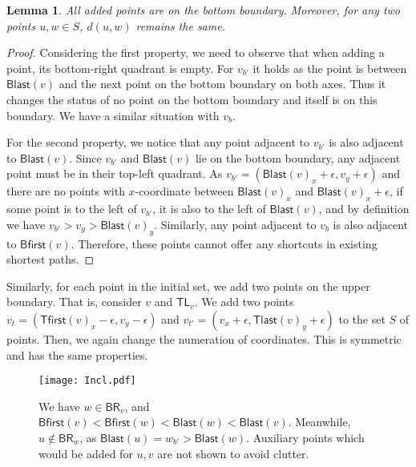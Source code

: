 \documentclass[a4paper,11pt]{article}
\newcommand{\BR}{\mathsf{BR}}
\newcommand{\TL}{\mathsf{TL}}
\newcommand{\Blast}{\mathsf{Blast}}
\newcommand{\Bfirst}{\mathsf{Bfirst}}
\newcommand{\Tlast}{\mathsf{Tlast}}
\newcommand{\Tfirst}{\mathsf{Tfirst}}
\newtheorem{lemma}[theorem]{Lemma}
\begin{document}
\begin{lemma}
All added points are on the bottom boundary.
Moreover, for any two points $u,w \in S$, $d(u,w)$ remains the same.
\end{lemma}
\begin{proof}
Considering the first property, we need to observe that when adding a point, its bottom-right quadrant is empty.
For $v_{b'}$ it holds as the point is between $\Blast(v)$ and the next point on the bottom boundary on both axes.
Thus it changes the status of no point on the bottom boundary and itself is on this boundary.
We have a similar situation with $v_{b}$.

For the second property, we notice that any point adjacent to $v_{b'}$ is also adjacent to $\Blast(v)$.
Since $v_{b'}$ and $\Blast(v)$ lie on the bottom boundary, any adjacent point must be in their top-left quadrant.
As $v_{b'}=(\Blast(v)_x+\epsilon,v_y+\epsilon)$ and there are no points with $x$-coordinate between $\Blast(v)_x$ and $\Blast(v)_x+\epsilon$,
if some point is to the left of $v_{b'}$, it is also to the left of $\Blast(v)$,
and by definition we have $v_{b'}>v_y>\Blast(v)_y$.
Similarly, any point adjacent to $v_{b}$ is also adjacent to $\Bfirst(v)$.
Therefore, these points cannot offer any shortcuts in existing shortest paths.
\end{proof}

Similarly, for each point in the initial set, we add two points on the upper boundary.
That is, consider $v$ and $\TL_v$.
We add two points $v_{t}=(\Tfirst(v)_x-\epsilon,v_y-\epsilon)$ and $v_{t'}=(v_x+\epsilon, \Tlast(v)_y+\epsilon)$ to the set $S$ of points.
Then, we again change the numeration of coordinates.
This is symmetric and has the same properties.

\begin{figure}[h]
\begin{center}
  \texttt{[image: Incl.pdf]}
\end{center}
\caption{We have $w \in \BR_v$, and $\Bfirst(v) < \Bfirst(w) < \Blast(w) < \Blast(v)$.
Meanwhile, $u \notin \BR_w$, as $\Blast(u)=w_{b'}>\Blast(w)$.
Auxiliary points which would be added for $u,v$ are not shown to avoid clutter.}
\label{Fig:Incl}
\end{figure}
\end{document}
